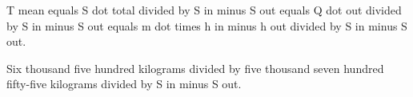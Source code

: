 T mean equals S dot total divided by S in minus S out equals Q dot out divided by S in minus S out equals m dot times h in minus h out divided by S in minus S out.  

Six thousand five hundred kilograms divided by five thousand seven hundred fifty-five kilograms divided by S in minus S out.